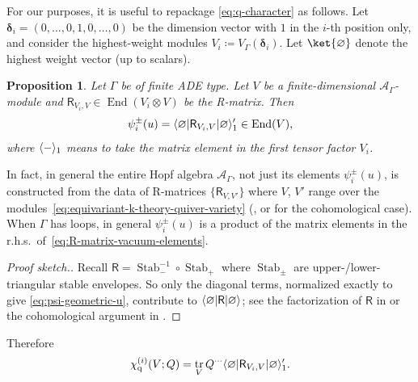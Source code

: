\documentclass[10pt,a4paper]{amsart}
\numberwithin{equation}{section}
\newtheorem{Proposition}[Theorem]{Proposition}
\renewcommand{\vec}[1]{\bm{#1}}
\newcommand{\kQ}{Q}
\newcommand{\scA}{\mathscr{A}}
\newcommand{\sR}{\mathsf{R}}
\newcommand{\chiq}{\chi_{\mathrm{q}}}
\DeclareMathOperator{\End}{End}
\DeclareMathOperator{\tr}{tr}
\DeclareMathOperator{\Stab}{Stab}
\DeclarePairedDelimiter{\inner}{\langle}{\rangle}
\begin{document}
\begin{MyParagraph}
For our purposes, it is useful to repackage \eqref{eq:q-character} as
follows. Let $\vec\delta_i = (0, \ldots, 0, 1, 0, \ldots, 0)$ be the
dimension vector with $1$ in the $i$-th position only, and consider
the highest-weight modules $V_i \coloneqq V_\Gamma(\vec\delta_i)$. Let
$\ket{\varnothing}$ denote the highest weight vector (up to scalars).

\begin{Proposition}
 Let $\Gamma$ be of finite ADE type. Let $V$ be a finite-dimensional
 $\scA_\Gamma$-module and $\sR_{V_i,V} \in \End(V_i \otimes V)$ be the
 R-matrix. Then
 \begin{equation} \label{eq:R-matrix-vacuum-elements}
 \psi_i^\pm(u) = \inner{\varnothing | \sR_{V_i,V} | \varnothing}_1' \in \End(V),
 \end{equation}
 where $\inner{-}_1$ means to take the matrix element in the first
 tensor factor $V_i$.
\end{Proposition}

In fact, in general the entire Hopf algebra $\scA_\Gamma$, not just
its elements $\psi_i^\pm(u)$, is constructed from the data of
R-matrices $\{\sR_{V,V'}\}$ where $V$, $V'$ range over the modules~\eqref{eq:equivariant-k-theory-quiver-variety} (\cite{Reshetikhin1989},
\cite[Section~3]{Okounkov2016}  or \cite[Section~5]{Maulik2019} for the
cohomological case). When $\Gamma$ has loops, in general
$\psi_i^\pm(u)$ is a product of the matrix elements in the r.h.s.\ of~\eqref{eq:R-matrix-vacuum-elements}.

\begin{proof}[Proof sketch.]
 Recall $\sR = \Stab_-^{-1} \circ \Stab_+$ where $\Stab_\pm$ are
 upper-/lower-triangular stable envelopes. So only the diagonal
 terms, normalized exactly to give \eqref{eq:psi-geometric-u},
 contribute to $\inner{\varnothing | \sR | \varnothing}$; see the
 factorization of $\sR$ in \cite[Section~2.3]{Okounkov2016} or the
 cohomological argument in \cite[Section~4.7]{Maulik2019}.
\end{proof}

Therefore
\begin{equation} \label{eq:q-character-as-vacuum-matrix-element}
 \chiq^{(i)}(V; \kQ) = \tr_V \kQ^{\cdots} \inner{\varnothing | \sR_{V_i,V} | \varnothing}_1'.
\end{equation}
\end{MyParagraph}
\end{document}
